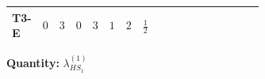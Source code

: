 \documentclass[8pt]{article}
\begin{document}
\begin{landscape}
\begin{longtable}{@{}llcccccc >{\raggedright\arraybackslash}p{0.21\linewidth} >{\raggedright\arraybackslash}p{0.21\linewidth} >{\raggedright\arraybackslash}p{0.21\linewidth}@{}}
\midrule
T3-E & $0$ & $3$ & $0$ & $3$ & $1$ & $2$ & $\frac{1}{2}$ & \scriptsize\adjustbox{max width=\linewidth}{$\begin{gathered} -\frac{3 {g_1}^2 {\lambda_{HS_1}^{(1)}}}{2}\end{gathered}$} & \scriptsize\adjustbox{max width=\linewidth}{$\begin{gathered} {\lambda_{HS_1}^{(1)}} (6 \operatorname{Tr}\!\left({Y_d}\,\left({Y_d}\right)^{\dagger}\right)+2 \operatorname{Tr}\!\left({Y_e}\,\left({Y_e}\right)^{\dagger}\right)+6 \operatorname{Tr}\!\left({Y_u}\,\left({Y_u}\right)^{\dagger}\right)+4 {\lambda_{S_1}^{(A)}})\end{gathered}$} & \scriptsize\adjustbox{max width=\linewidth}{$\begin{gathered} +6 {g_2}^4\end{gathered}$} \\
\midrule
\bottomrule
\end{longtable}
\clearpage
\noindent\textbf{Quantity: }$\lambda_{HS_1}^{(1)}$\par\smallskip

\end{landscape}
\end{document}
